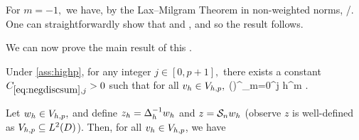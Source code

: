 For $m=-1,$ we have, by the Lax--Milgram Theorem in non-weighted norms,
\beqs
\NHoD{\Sn \ftilde} \leq {}/\Amin.
\eeqs
One can straightforwardly show that
\beqs
{} \leq \nmax \NHoD{\Sn \ftilde}
\eeqs
and
\beqs
{} \leq \nmax {},
\eeqs
and so the result follows.
\epf



We can now prove the main result of this .

\label{lem:negdiscsum}
Under \cref{ass:highp}, for any integer $j \in [0,p+1],$ there exists a constant $\Csumj > 0$ such that for all $v_{h} \in V_{h,p},$
\beq\label{eq:negdiscsum}
 \leq \Csumj\mleft(\En\nvar\mright)^{}\nmax \sum_{m=0}^j h^{m} .
\eeq
\ele

Let $w_{h} \in V_{h,p},$ and define $z_{h} = \Delta_{h}^{-1} w_{h}$ and $z = \mathcal S_{n} w_{h}$ (observe $z$ is well-defined as $\Vhp \subseteq \LtD$). Then, for all $v_{h} \in V_{h,p}$, we have

